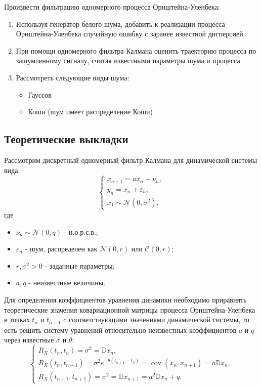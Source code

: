 \documentclass[11pt]{report}
\begin{document}
Произвести фильтрацию одномерного процесса Орнштейна-Уленбека:
\begin{enumerate}
\item Используя генератор белого шума, добавить к реализации процесса Орнштейна-Уленбека случайную ошибку с заранее известной дисперсией.
\item При помощи одномерного фильтра Калмана оценить траекторию процесса по зашумленному сигналу, считая известными параметры шума и процесса.
\item Рассмотреть следующие виды шума:
\begin{itemize}
\item Гауссов
\item Коши (шум имеет распределение Коши)
\end{itemize}
\end{enumerate}

\subsection{Теоретические выкладки}

Рассмотрим дискретный одномерный фильтр Калмана для динамической системы вида:
$$
\begin{cases}
x_{n+1} = ax_n + \nu_n, \\
y_n = x_n + \varepsilon_n, \\
x_1 \sim \mathcal{N}(0,\sigma^2),
\end{cases}
$$
где 
\begin{itemize}
\item $\nu_n\sim\mathcal{N}(0,q)$ - н.о.р.с.в.;
\item $\varepsilon_n$ - шум, распределен как $\mathcal{N}(0,r)$ или $\mathcal{C}(0,r)$;
\item $r,\sigma^2 > 0$ - заданные параметры;
\item $a,q$ - неизвестные величины.
\end{itemize}

Для определения коэффициентов уравнения динамики необходимо приравнять теоретические значения ковариационной матрицы процесса Орнштейна-Уленбека в
точках $t_n$ и $t_{n+1}$ c соответствующими значениями динамической системы, то есть решить систему уравнений относительно неизвестных коэффициентов $a$ и $q$ через известные $\sigma$ и $\theta$:
$$
\begin{cases}
R_X(t_n,t_n) = \sigma^2 = \mathbb{D}x_n, \\
R_X(t_n,t_{n+1}) = \sigma^2 e^{-\theta(t_{n+1}-t_n)} = \operatorname{cov}(x_n,x_{n+1}) = a\mathbb{D}x_n, \\
R_X(t_{n+1},t_{n+1}) = \sigma^2 = \mathbb{D}x_{n+1} = a^2 \mathbb{D}x_n + q.
\end{cases}
$$
\end{document}
